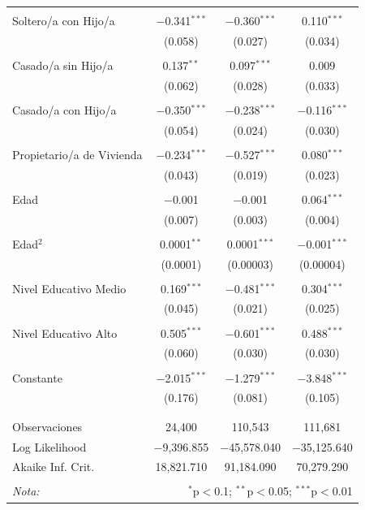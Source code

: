 \documentclass[12pt,a4paper]{article}
\begin{document}
\begin{table}[!htbp]
\begin{tabular}{@{\extracolsep{5pt}}lccc}
  & & & \\ 
 Soltero/a con Hijo/a & $-$0.341$^{***}$ & $-$0.360$^{***}$ & 0.110$^{***}$ \\ 
  & (0.058) & (0.027) & (0.034) \\ 
  & & & \\ 
 Casado/a sin Hijo/a & 0.137$^{**}$ & 0.097$^{***}$ & 0.009 \\ 
  & (0.062) & (0.028) & (0.033) \\ 
  & & & \\ 
 Casado/a con Hijo/a & $-$0.350$^{***}$ & $-$0.238$^{***}$ & $-$0.116$^{***}$ \\ 
  & (0.054) & (0.024) & (0.030) \\ 
  & & & \\ 
 Propietario/a de Vivienda & $-$0.234$^{***}$ & $-$0.527$^{***}$ & 0.080$^{***}$ \\ 
  & (0.043) & (0.019) & (0.023) \\ 
  & & & \\ 
 Edad & $-$0.001 & $-$0.001 & 0.064$^{***}$ \\ 
  & (0.007) & (0.003) & (0.004) \\ 
  & & & \\ 
 Edad$^2$ & 0.0001$^{**}$ & 0.0001$^{***}$ & $-$0.001$^{***}$ \\ 
  & (0.0001) & (0.00003) & (0.00004) \\ 
  & & & \\ 
 Nivel Educativo Medio & 0.169$^{***}$ & $-$0.481$^{***}$ & 0.304$^{***}$ \\ 
  & (0.045) & (0.021) & (0.025) \\ 
  & & & \\ 
 Nivel Educativo Alto & 0.505$^{***}$ & $-$0.601$^{***}$ & 0.488$^{***}$ \\ 
  & (0.060) & (0.030) & (0.030) \\ 
  & & & \\ 
 Constante & $-$2.015$^{***}$ & $-$1.279$^{***}$ & $-$3.848$^{***}$ \\ 
  & (0.176) & (0.081) & (0.105) \\ 
  & & & \\ 
\hline \\[-1.8ex] 
Observaciones & 24,400 & 110,543 & 111,681 \\ 
Log Likelihood & $-$9,396.855 & $-$45,578.040 & $-$35,125.640 \\ 
Akaike Inf. Crit. & 18,821.710 & 91,184.090 & 70,279.290 \\ 
\hline 
\hline \\[-1.8ex] 
\textit{Nota:}  & \multicolumn{3}{r}{$^{*}$p$<$0.1; $^{**}$p$<$0.05; $^{***}$p$<$0.01} \\ 
\end{tabular} 
\end{table} 
\end{document}
